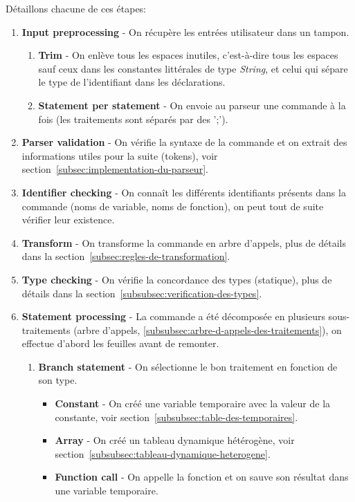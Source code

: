 \documentclass[french]{article}
\begin{document}
			Détaillons chacune de ces étapes:
			\begin{enumerate}
				\item \textbf{Input preprocessing} - On récupère les entrées utilisateur dans un tampon.
				\begin{enumerate}
					\item \textbf{Trim} - On enlève tous les espaces inutiles, c'est-à-dire tous les espaces sauf ceux dans les constantes littérales de type \textit{String}, et celui qui sépare le type de l'identifiant dans les déclarations.
					\item \textbf{Statement per statement} - On envoie au parseur une commande à la fois (les traitements sont séparés par des ';').
				\end{enumerate}
				\item \textbf{Parser validation} - On vérifie la syntaxe de la commande et on extrait des informations utiles pour la suite (tokens), voir section~\ref{subsec:implementation-du-parseur}.
				\item \textbf{Identifier checking} - On connaît les différents identifiants présents dans la commande (noms de variable, noms de fonction), on peut tout de suite vérifier leur existence.
				\item \textbf{Transform} - On transforme la commande en arbre d'appels, plus de détails dans la section~\ref{subsec:regles-de-transformation}.
				\item \textbf{Type checking} - On vérifie la concordance des types (statique), plus de détails dans la section~\ref{subsubsec:verification-des-types}.
				\item \textbf{Statement processing} - La commande a été décomposée en plusieurs sous-traitements (arbre d'appels, \ref{subsubsec:arbre-d-appels-des-traitements}), on effectue d'abord les feuilles avant de remonter.
				\begin{enumerate}
					\item \textbf{Branch statement} - On sélectionne le bon traitement en fonction de son type.
					\begin{itemize}
						\item \textbf{Constant} - On créé une variable temporaire avec la valeur de la constante, voir section~\ref{subsubsec:table-des-temporaires}.
						\item \textbf{Array} - On créé un tableau dynamique hétérogène, voir section~\ref{subsubsec:tableau-dynamique-heterogene}.
						\item \textbf{Function call} - On appelle la fonction et on sauve son résultat dans une variable temporaire.

\end{itemize}
\end{enumerate}
\end{enumerate}
\end{document}
